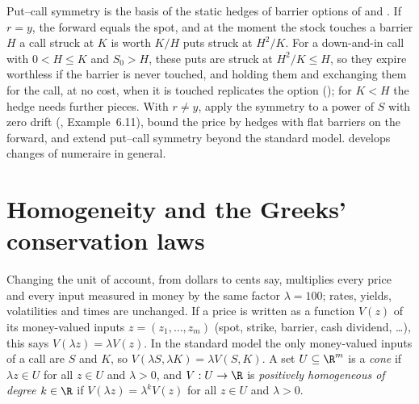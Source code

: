 Put--call symmetry is the basis of the static hedges of barrier options of \textcite{bowie-carr} and
\textcite{carr-chou}. If $r=y$, the forward equals the spot, and at the moment the stock touches a barrier
$H$ a call struck at $K$ is worth $K/H$ puts struck at $H^2/K$. For a down-and-in call with $0<H\le K$ and
$S_0>H$, these puts are struck at $H^2/K\le H$, so they expire worthless if the barrier is never touched, and
holding them and exchanging them for the call, at no cost, when it is touched replicates the option
(); for $K<H$ the hedge needs further pieces. With $r\ne y$, \textcite{carr-chou} apply the
symmetry to a power of $S$ with zero drift (\textcite{carr-lee-pcs}, Example~6.11), \textcite{carr-ellis-gupta}
bound the price by hedges with flat barriers on the forward, and \textcite{carr-lee-pcs} extend put--call symmetry
beyond the standard model.  develops changes of numeraire in general.


\section{Homogeneity and the Greeks' conservation laws}\label{sec:sr-euler}

Changing the unit of account, from dollars to cents say, multiplies every price and every input measured
in money by the same factor $\lambda=100$; rates, yields, volatilities and times are unchanged. If a price
is written as a function $V(z)$ of its money-valued inputs $z=(z_1,\dots,z_m)$ (spot, strike, barrier, cash
dividend, \dots), this says $V(\lambda z)=\lambda V(z)$. In the standard model the only money-valued inputs of a
call are $S$ and $K$, so $V(\lambda S,\lambda K)=\lambda V(S,K)$. A set $U\subseteq\R^m$ is a \emph{cone} if $\lambda
z\in U$ for all $z\in U$ and $\lambda>0$, and $V:U\to\R$ is \emph{positively homogeneous of degree $k\in\R$} if
$V(\lambda z)=\lambda^kV(z)$ for all $z\in U$ and $\lambda>0$.

